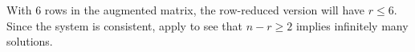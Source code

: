 With 6 rows in the augmented matrix, the row-reduced version will have $r\leq 6$.  Since the system is consistent, apply  to see that $n-r\geq 2$ implies infinitely many solutions.

